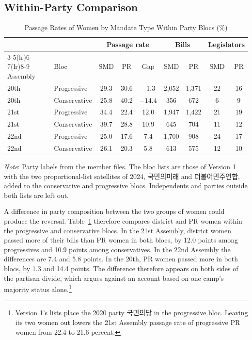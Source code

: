 \documentclass[11pt]{article}
\begin{document}
\subsection{Within-Party Comparison}

\begin{table}[htbp]
\centering
\caption{Passage Rates of Women by Mandate Type Within Party Blocs (\%)}
\label{tab:blocs}
\small
\begin{tabular}{llccccccc}
\toprule
& & \multicolumn{3}{c}{Passage rate} & \multicolumn{2}{c}{Bills} & \multicolumn{2}{c}{Legislators} \\
\cmidrule(lr){3-5}\cmidrule(lr){6-7}\cmidrule(lr){8-9}
Assembly & Bloc & SMD & PR & Gap & SMD & PR & SMD & PR \\
\midrule
20th & Progressive & 29.3 & 30.6 & $-1.3$ & 2,052 & 1,371 & 22 & 16 \\
20th & Conservative & 25.8 & 40.2 & $-14.4$ & 356 & 672 & 6 & 9 \\
21st & Progressive & 34.4 & 22.4 & 12.0 & 1,947 & 1,422 & 21 & 19 \\
21st & Conservative & 39.7 & 28.8 & 10.9 & 645 & 704 & 11 & 12 \\
22nd & Progressive & 25.0 & 17.6 & 7.4 & 1,700 & 908 & 24 & 17 \\
22nd & Conservative & 26.1 & 20.3 & 5.8 & 613 & 575 & 12 & 10 \\
\bottomrule
\end{tabular}

\vspace{4pt}
\parbox{0.92\textwidth}{\footnotesize \textit{Note}: Party labels from the member files. The bloc lists are those of Version 1 with the two proportional-list satellites of 2024, 국민의미래 and 더불어민주연합, added to the conservative and progressive blocs. Independents and parties outside both lists are left out.}
\end{table}

A difference in party composition between the two groups of women could produce the reversal. Table~\ref{tab:blocs} therefore compares district and PR women within the progressive and conservative blocs. In the 21st Assembly, district women passed more of their bills than PR women in both blocs, by 12.0 points among progressives and 10.9 points among conservatives. In the 22nd Assembly the differences are 7.4 and 5.8 points. In the 20th, PR women passed more in both blocs, by 1.3 and 14.4 points. The difference therefore appears on both sides of the partisan divide, which argues against an account based on one camp's majority status alone.\footnote{Version 1's lists place the 2020 party 국민의당 in the progressive bloc. Leaving its two women out lowers the 21st Assembly passage rate of progressive PR women from 22.4 to 21.6 percent.}
\end{document}
